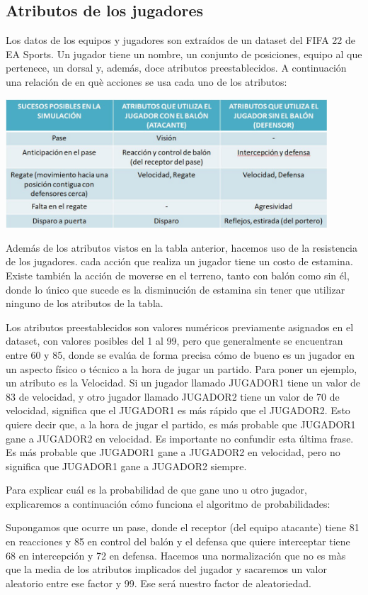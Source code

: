 \documentclass{article}
\begin{document}
\subsection{Atributos de los jugadores}
Los datos de los equipos y jugadores son extraídos de un dataset del FIFA 22 de EA Sports. Un jugador tiene un nombre, 
un conjunto de posiciones, equipo al que pertenece, un dorsal y, además, doce atributos preestablecidos. A 
continuación una relación de en què acciones se usa cada uno de los atributos:

\includegraphics*[width=0.9\textwidth]{attributed_table.jpg}
\bigskip

Además de los atributos vistos en la tabla anterior, hacemos uso de la resistencia de los jugadores. cada acción que realiza un jugador tiene un costo de estamina. Existe también la acción de moverse en  el terreno, tanto con balón como sin él, donde lo único que sucede es la disminución de estamina sin tener que utilizar ninguno de los atributos de la tabla.

Los atributos preestablecidos son valores numéricos previamente asignados en el dataset, con valores posibles del 1 al 
99, pero que generalmente se encuentran entre 60 y 85, donde se evalúa de forma precisa cómo de bueno es un jugador en 
un aspecto físico o técnico a la hora de jugar un partido. Para poner un ejemplo, un atributo es la Velocidad. Si un 
jugador llamado JUGADOR1 tiene un valor de 83 de velocidad, y otro jugador llamado JUGADOR2 tiene un valor de 70 de 
velocidad, significa que el JUGADOR1 es más rápido que el JUGADOR2. Esto quiere decir que, a la hora de jugar el 
partido, es más probable que JUGADOR1 gane a JUGADOR2 en velocidad. Es importante no confundir esta última frase. 
Es más probable que JUGADOR1 gane a JUGADOR2 en velocidad, pero no significa que JUGADOR1 gane a JUGADOR2 siempre.

Para explicar cuál es la probabilidad de que gane uno u otro jugador,
explicaremos a continuación cómo funciona el algoritmo de probabilidades:

Supongamos que ocurre un pase, donde el receptor (del equipo atacante) tiene 81 en reacciones y 85 en control del 
balón y el defensa que quiere interceptar tiene 68 en intercepción y 72 en defensa. Hacemos una normalización que 
no es màs que la media de los atributos implicados del jugador y sacaremos un valor aleatorio entre ese factor y 99. 
Ese será nuestro factor de aleatoriedad.
\end{document}
